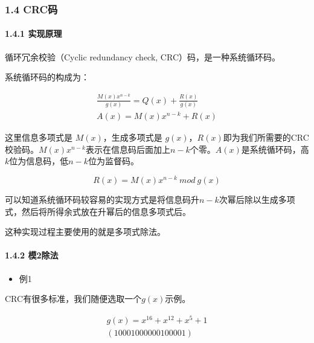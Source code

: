 \documentclass[
]{article}
\begin{document}
\hypertarget{header-n78}{%
\subsubsection{1.4 CRC码}\label{header-n78}}

\hypertarget{header-n79}{%
\paragraph{1.4.1 实现原理}\label{header-n79}}

循环冗余校验（Cyclic redundancy check, CRC）码，是一种系统循环码。

系统循环码的构成为：

\begin{equation}
\begin{aligned}
\frac{M(x)x^{n-k}}{g(x)} = Q(x) + \frac{R(x)}{g(x)}\\
A(x)=M(x)x^{n-k}+R(x)
\end{aligned}
\end{equation}

这里信息多项式是 $M(x)$，生成多项式是
$g(x)$，$R(x)$即为我们所需要的CRC校验码。$M(x)x^{n-k}$表示在信息码后面加上$n-k$个零。$A(x)$是系统循环码，高$k$位为信息码，低$n-k$位为监督码。

\begin{equation}
R(x)=M(x)x^{n-k} \: mod \: g(x)
\end{equation}

可以知道系统循环码较容易的实现方式是将信息码升$n-k$次幂后除以生成多项式，然后将所得余式放在升幂后的信息多项式后。

这种实现过程主要使用的就是多项式除法。

\hypertarget{header-n87}{%
\paragraph{1.4.2 模2除法}\label{header-n87}}

\begin{itemize}
\item
  例1
\end{itemize}

CRC有很多标准，我们随便选取一个$g(x)$示例。

\begin{equation}
\begin{aligned}
g(x)=x^{16}+x^{12}+x^5+1\\
(10001000000100001)
\end{aligned}
\end{equation}
\end{document}
